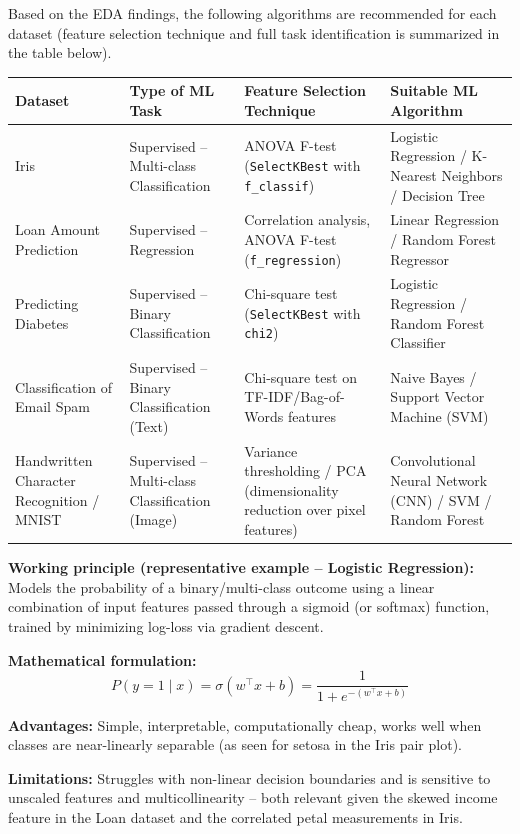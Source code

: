 \documentclass[12pt,a4paper]{article}
\begin{document}
Based on the EDA findings, the following algorithms are recommended for each dataset (feature
selection technique and full task identification is summarized in the table below).

\begin{longtable}{|p{3.3cm}|p{2.6cm}|p{3.6cm}|p{4.7cm}|}
\hline
\textbf{Dataset} & \textbf{Type of ML Task} & \textbf{Feature Selection Technique} & \textbf{Suitable ML Algorithm} \\ \hline
\endhead
Iris & Supervised -- Multi-class Classification & ANOVA F-test (\texttt{SelectKBest} with \texttt{f\_classif}) & Logistic Regression / K-Nearest Neighbors / Decision Tree \\ \hline
Loan Amount Prediction & Supervised -- Regression & Correlation analysis, ANOVA F-test (\texttt{f\_regression}) & Linear Regression / Random Forest Regressor \\ \hline
Predicting Diabetes & Supervised -- Binary Classification & Chi-square test (\texttt{SelectKBest} with \texttt{chi2}) & Logistic Regression / Random Forest Classifier \\ \hline
Classification of Email Spam & Supervised -- Binary Classification (Text) & Chi-square test on TF-IDF/Bag-of-Words features & Naive Bayes / Support Vector Machine (SVM) \\ \hline
Handwritten Character Recognition / MNIST & Supervised -- Multi-class Classification (Image) & Variance thresholding / PCA (dimensionality reduction over pixel features) & Convolutional Neural Network (CNN) / SVM / Random Forest \\ \hline
\end{longtable}

\textbf{Working principle (representative example -- Logistic Regression):} Models the
probability of a binary/multi-class outcome using a linear combination of input features
passed through a sigmoid (or softmax) function, trained by minimizing log-loss via gradient
descent.

\textbf{Mathematical formulation:}
$$P(y=1\mid x) = \sigma(w^\top x + b) = \frac{1}{1+e^{-(w^\top x + b)}}$$

\textbf{Advantages:} Simple, interpretable, computationally cheap, works well when classes
are near-linearly separable (as seen for setosa in the Iris pair plot).

\textbf{Limitations:} Struggles with non-linear decision boundaries and is sensitive to
unscaled features and multicollinearity -- both relevant given the skewed income feature in
the Loan dataset and the correlated petal measurements in Iris.
\end{document}
